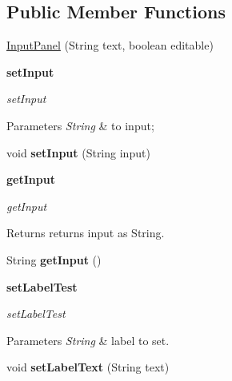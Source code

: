 \subsection*{Public Member Functions}
\begin{DoxyCompactItemize}
\item 
\hyperlink{classbattleship_1_1screen_1_1InputPanel_ae3323bb68f0ee23d8a85e10b57b15a1f}{Input\+Panel} (String text, boolean editable)
\end{DoxyCompactItemize}
\begin{Indent}{\bf set\+Input}\par
{\em set\+Input


\begin{DoxyParams}{Parameters}
{\em String} & to input; \\
\hline
\end{DoxyParams}
}\begin{DoxyCompactItemize}
\item 
\hypertarget{classbattleship_1_1screen_1_1InputPanel_a3ccea93e3d360e8bffb5741478e291bc}{}void {\bfseries set\+Input} (String input)\label{classbattleship_1_1screen_1_1InputPanel_a3ccea93e3d360e8bffb5741478e291bc}

\end{DoxyCompactItemize}
\end{Indent}
\begin{Indent}{\bf get\+Input}\par
{\em get\+Input

\begin{DoxyReturn}{Returns}
returns input as String. 
\end{DoxyReturn}
}\begin{DoxyCompactItemize}
\item 
\hypertarget{classbattleship_1_1screen_1_1InputPanel_ac1a3a5faa5747bc638fbf06a08caa0bb}{}String {\bfseries get\+Input} ()\label{classbattleship_1_1screen_1_1InputPanel_ac1a3a5faa5747bc638fbf06a08caa0bb}

\end{DoxyCompactItemize}
\end{Indent}
\begin{Indent}{\bf set\+Label\+Test}\par
{\em set\+Label\+Test


\begin{DoxyParams}{Parameters}
{\em String} & label to set. \\
\hline
\end{DoxyParams}
}\begin{DoxyCompactItemize}
\item 
\hypertarget{classbattleship_1_1screen_1_1InputPanel_abc88e8586b183dbce8978dfd495ff3b6}{}void {\bfseries set\+Label\+Text} (String text)\label{classbattleship_1_1screen_1_1InputPanel_abc88e8586b183dbce8978dfd495ff3b6}

\end{DoxyCompactItemize}
\end{Indent}

